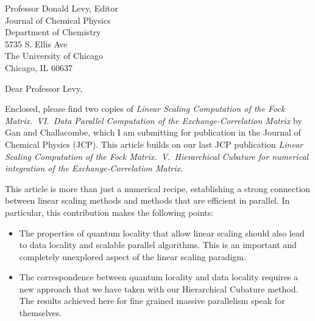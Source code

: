 
\pagestyle{empty}

\signature{Matt Challacombe}

\address{
Dr.~Matt Challacombe \\
(mchalla@lanl.gov) \\
Theoretical Division \\
Group T-12, MS B268 \\
Los Alamos National Laboratory \\
Los Alamos, NM 87545 }

\begin{letter}{
Professor Donald Levy, Editor\\
Journal of Chemical Physics\\
Department of Chemistry\\
5735 S. Ellis Ave\\
The University of Chicago\\
Chicago, IL 60637}

\opening{Dear Professor Levy,}

Enclosed, please find two copies of 
{\em Linear Scaling Computation of the Fock Matrix.~VI.~Data Parallel Computation 
of the Exchange-Correlation Matrix} by Gan and Challacombe,
which I am submitting for publication in the Journal of Chemical Physics (JCP). This 
article builds 
on our last JCP publication {\em Linear Scaling Computation of the Fock Matrix.~V.~Hierarchical Cubature
for numerical integration of the Exchange-Correlation Matrix}.

This article is more than just a numerical recipe, establishing a strong connection between linear 
scaling methods and methods that are efficient in parallel. In particular, this contribution 
makes the following points:

\pagebreak


\begin{itemize}
\item The properties of quantum locality that allow linear scaling should also lead to 
      data locality and scalable parallel algorithms.  This is an important and completely 
      unexplored aspect of the linear scaling paradigm.

\item The correspondence between quantum locality and data locality requires a new approach
      that we have taken with our Hierarchical Cubature method. 
      The results achieved here for fine grained massive parallelism speak for themselves.


\end{itemize}
\end{letter}
